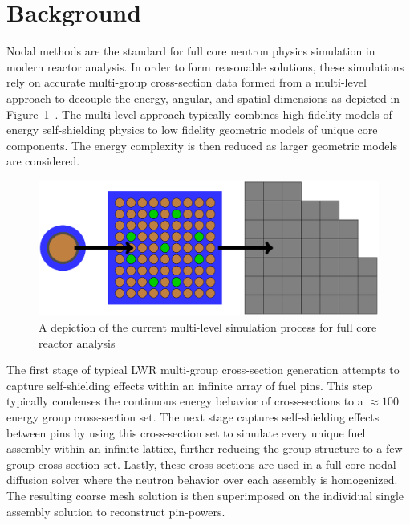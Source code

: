 \section{Background}
\label{sec:chap1-background}

Nodal methods are the standard for full core neutron physics simulation in modern reactor analysis. In order to form reasonable solutions, these simulations rely on accurate multi-group cross-section data formed from a multi-level approach to decouple the energy, angular, and spatial dimensions as depicted in Figure~\ref{fig:multi-level}~\cite{boyd2017thesis}. The multi-level approach typically combines high-fidelity models of energy self-shielding physics to low fidelity geometric models of unique core components. The energy complexity is then reduced as larger geometric models are considered.

\begin{figure}[ht!]
	\centering
	\includegraphics[width=\linewidth]{figures/intro/multi-step-flow-chart.png}
	\caption{A depiction of the current multi-level simulation process for full core reactor analysis}
	\label{fig:multi-level}
\end{figure}

The first stage of typical \ac{LWR} multi-group cross-section generation attempts to capture self-shielding effects within an infinite array of fuel pins. This step typically condenses the continuous energy behavior of cross-sections to a $\approx 100$ energy group cross-section set. The next stage captures self-shielding effects between pins by using this cross-section set to simulate every unique fuel assembly within an infinite lattice, further reducing the group structure to a few group cross-section set. Lastly, these cross-sections are used in a full core nodal diffusion solver where the neutron behavior over each assembly is homogenized. The resulting coarse mesh solution is then superimposed on the individual single assembly solution to reconstruct pin-powers.

